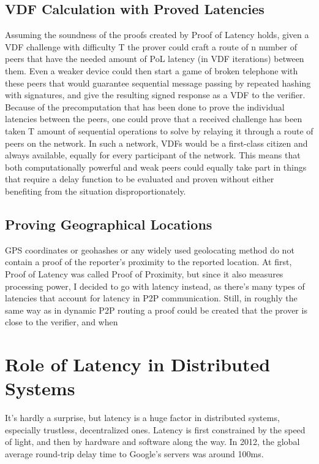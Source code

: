 \subsection{VDF Calculation with Proved Latencies}
Assuming the soundness of the proofs created by Proof of Latency holds, given a VDF challenge with difficulty T the prover could craft a route of n number of peers that have the needed amount of PoL latency (in VDF iterations) between them. Even a weaker device could then start a game of broken telephone with these peers that would guarantee sequential message passing by repeated hashing with signatures, and give the resulting signed response as a VDF to the verifier. Because of the precomputation that has been done to prove the individual latencies between the peers, one could prove that a received challenge has been taken T amount of sequential operations to solve by relaying it through a route of peers on the network. In such a network, VDFs would be a first-class citizen and always available, equally for every participant of the network. This means that both computationally powerful and weak peers could equally take part in things that require a delay function to be evaluated and proven without either benefiting from the situation disproportionately.

\subsection{Proving Geographical Locations}
GPS coordinates or geohashes or any widely used geolocating method do not contain a proof of the reporter's proximity to the reported location. At first, Proof of Latency was called Proof of Proximity, but since it also measures processing power, I decided to go with latency instead, as there's many types of latencies that account for latency in P2P communication. Still, in roughly the same way as in dynamic P2P routing a proof could be created that the prover is close to the verifier, and when


\section{Role of Latency in Distributed Systems}
It's hardly a surprise, but latency is a huge factor in distributed systems, especially trustless, decentralized ones. Latency is first constrained by the speed of light, and then by hardware and software along the way. In 2012, the global average round-trip delay time to Google's servers was around 100ms.~\cite{Grigorik_undated-mc}

